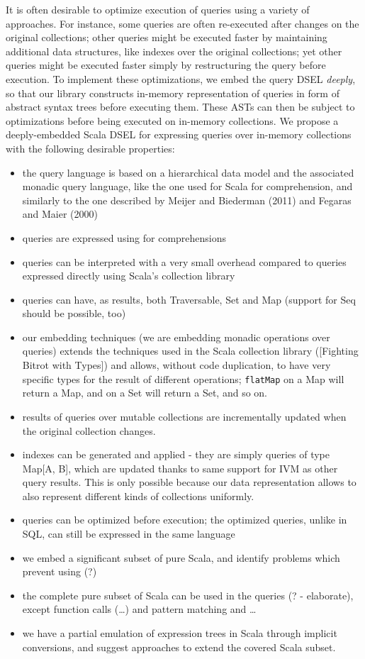 \documentclass[preprint,authoryear,10pt]{sigplanconf}
\begin{document}
It is often desirable to optimize execution of queries using a variety
of approaches. For instance, some queries are often re-executed after
changes on the original collections; other queries might be executed
faster by maintaining additional data structures, like indexes over the
original collections; yet other queries might be executed faster simply
by restructuring the query before execution. To implement these
optimizations, we embed the query DSEL \emph{deeply}, so that our
library constructs in-memory representation of queries in form of
abstract syntax trees before executing them. These ASTs can then be
subject to optimizations before being executed on in-memory collections.
We propose a deeply-embedded Scala DSEL for expressing queries over
in-memory collections with the following desirable properties:

\begin{itemize}
\item
  the query language is based on a hierarchical data model and the
  associated monadic query language, like the one used for Scala for
  comprehension, and similarly to the one described by Meijer and
  Biederman (2011) and Fegaras and Maier (2000)
\item
  queries are expressed using for comprehensions
\item
  queries can be interpreted with a very small overhead compared to
  queries expressed directly using Scala's collection library
\item
  queries can have, as results, both Traversable, Set and Map (support
  for Seq should be possible, too)
\item
  our embedding techniques (we are embedding monadic operations over
  queries) extends the techniques used in the Scala collection library
  ({[}Fighting Bitrot with Types{]}) and allows, without code
  duplication, to have very specific types for the result of different
  operations; \texttt{flatMap} on a Map will return a Map, and on a Set
  will return a Set, and so on.
\item
  results of queries over mutable collections are incrementally updated
  when the original collection changes.
\item
  indexes can be generated and applied - they are simply queries of type
  Map{[}A, B{]}, which are updated thanks to same support for IVM as
  other query results. This is only possible because our data
  representation allows to also represent different kinds of collections
  uniformly.
\item
  queries can be optimized before execution; the optimized queries,
  unlike in SQL, can still be expressed in the same language
\item
  we embed a significant subset of pure Scala, and identify problems
  which prevent using (?)
\item
  the complete pure subset of Scala can be used in the queries (? -
  elaborate), except function calls (\ldots{}) and pattern matching and
  \ldots{}
\item
  we have a partial emulation of expression trees in Scala through
  implicit conversions, and suggest approaches to extend the covered
  Scala subset.
\end{itemize}
\end{document}
